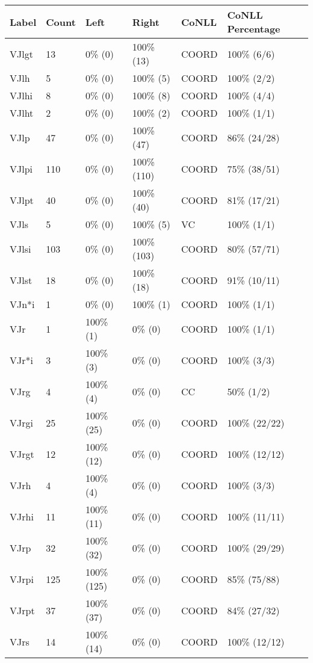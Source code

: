 \begin{figure*}
\begin{tabular}{|l|l|l|l||l|l|}
\hline
Label & Count & Left & Right & CoNLL & CoNLL Percentage\\ 
\hline
 VJlgt & 13 & 0\% (0) & 100\% (13) & COORD & 100\% (6/6) \\ 
\hline
 VJlh & 5 & 0\% (0) & 100\% (5) & COORD & 100\% (2/2) \\ 
\hline
 VJlhi & 8 & 0\% (0) & 100\% (8) & COORD & 100\% (4/4) \\ 
\hline
 VJlht & 2 & 0\% (0) & 100\% (2) & COORD & 100\% (1/1) \\ 
\hline
 VJlp & 47 & 0\% (0) & 100\% (47) & COORD & 86\% (24/28) \\ 
\hline
 VJlpi & 110 & 0\% (0) & 100\% (110) & COORD & 75\% (38/51) \\ 
\hline
 VJlpt & 40 & 0\% (0) & 100\% (40) & COORD & 81\% (17/21) \\ 
\hline
 VJls & 5 & 0\% (0) & 100\% (5) & VC & 100\% (1/1) \\ 
\hline
 VJlsi & 103 & 0\% (0) & 100\% (103) & COORD & 80\% (57/71) \\ 
\hline
 VJlst & 18 & 0\% (0) & 100\% (18) & COORD & 91\% (10/11) \\ 
\hline
 VJn*i & 1 & 0\% (0) & 100\% (1) & COORD & 100\% (1/1) \\ 
\hline
 VJr & 1 & 100\% (1) & 0\% (0) & COORD & 100\% (1/1) \\ 
\hline
 VJr*i & 3 & 100\% (3) & 0\% (0) & COORD & 100\% (3/3) \\ 
\hline
 VJrg & 4 & 100\% (4) & 0\% (0) & CC & 50\% (1/2) \\ 
\hline
 VJrgi & 25 & 100\% (25) & 0\% (0) & COORD & 100\% (22/22) \\ 
\hline
 VJrgt & 12 & 100\% (12) & 0\% (0) & COORD & 100\% (12/12) \\ 
\hline
 VJrh & 4 & 100\% (4) & 0\% (0) & COORD & 100\% (3/3) \\ 
\hline
 VJrhi & 11 & 100\% (11) & 0\% (0) & COORD & 100\% (11/11) \\ 
\hline
 VJrp & 32 & 100\% (32) & 0\% (0) & COORD & 100\% (29/29) \\ 
\hline
 VJrpi & 125 & 100\% (125) & 0\% (0) & COORD & 85\% (75/88) \\ 
\hline
 VJrpt & 37 & 100\% (37) & 0\% (0) & COORD & 84\% (27/32) \\ 
\hline
 VJrs & 14 & 100\% (14) & 0\% (0) & COORD & 100\% (12/12) \\ 
\hline

\end{tabular}
\end{figure*}
